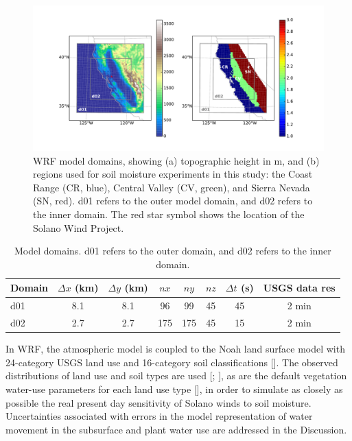 \begin{figure}[here]
\includegraphics[width=1\textwidth]{ch3-wind/img/domain_map_cropped.pdf}
\caption{WRF model domains, showing (a) topographic height in m, and (b) regions used for soil moisture experiments in this study: the Coast Range (CR, blue), Central Valley (CV, green), and Sierra Nevada (SN, red). d01 refers to the outer model domain, and d02 refers to the inner domain.  The red star symbol shows the location of the Solano Wind Project.}
\label{fig:windSol_domainmap}
\end{figure}

\begin{table}
\begin{tabular}{ l c c c c c c c }
\hline
Domain & $\Delta x$ (km) & $\Delta y$ (km) & $nx$ & $ny$ & $nz$ & $\Delta t$ (s) & USGS data res \\ \hline
d01 & 8.1 & 8.1 & 96 & 99 & 45 & 45 & 2 min\\
d02 & 2.7 & 2.7 & 175 & 175 & 45 & 15 & 2 min\\
\hline
\end{tabular}
\caption{Model domains. d01 refers to the outer domain, and d02 refers to the inner domain.}
\label{table:windSol_domains}
\end{table}

In WRF, the atmospheric model is coupled to the Noah land surface model with 24-category USGS land use and 16-category soil classifications [\cite{skamarock2008}].  The observed distributions of land use and soil types are used [\cite{eidenshink19941}; \cite{miller1998conterminous}], as are the default vegetation water-use parameters for each land use type [\cite{skamarock2008}], in order to simulate as closely as possible the real present day sensitivity of Solano winds to soil moisture.  Uncertainties associated with errors in the model representation of water movement in the subsurface and plant water use are addressed in the Discussion. 

